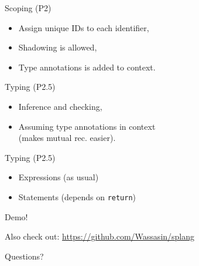 \documentclass[14pt]{beamer}
\title{\splang}
\author{Wouter Geraedts \and Joshua Moerman}
\institute{Radboud Universiteit Nijmegen}
\date{}
\newcommand{\demo}{\raisebox{0.2cm}{\tiny[\textsc{Demo}]}\xspace}
\begin{document}
\begin{frame}
\titlepage
\end{frame}


\begin{frame}
Scoping (P2)
\bigskip

\begin{itemize}
	\item Assign unique IDs to each identifier,
	\item Shadowing is allowed\demo,
	\item Type annotations is added to context.
\end{itemize}
\end{frame}


\begin{frame}
Typing (P2.5)
\bigskip

\begin{itemize}
	\item Inference and checking,
	\item Assuming type annotations in context \\
		(makes mutual rec. easier)\demo.
\end{itemize}
\end{frame}

\begin{frame}
Typing (P2.5)
\bigskip

\begin{itemize}
	\item Expressions (as usual)
	\item Statements (depends on \texttt{return})
\end{itemize}
\end{frame}


\begin{frame}
\begin{center}
\Huge Demo!
\end{center}
\bigskip

\begin{center}
Also check out:
\url{https://github.com/Wassasin/splang}
\end{center}
\end{frame}


\begin{frame}
\begin{center}
\Huge Questions?
\end{center}
\end{frame}
\end{document}
